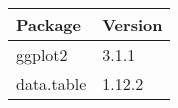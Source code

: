 \begin{tiny}
	\begin{table}[ht]
		\begin{tabular} {l|l}
			Package & Version \\ \hline
			ggplot2 & 3.1.1 \\
			data.table & 1.12.2 \\
			\end{tabular}
	\end{table}
\end{tiny}